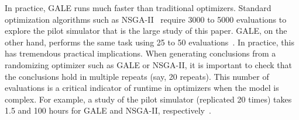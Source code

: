 \documentclass[journal]{IEEEtran}
\begin{document}
In practice, GALE runs much faster than traditional optimizers. 
Standard optimization algorithms such as NSGA-II~\cite{deb00afast} require 3000 to 5000 evaluations to explore the pilot simulator that is the large study of this paper. 
GALE, on the other hand, performs the same task using 25 to 50 evaluations~\cite{krallphd}.
In practice, this has tremendous practical implications.
When generating conclusions from a randomizing optimizer such as GALE or NSGA-II, it is important to check that the conclusions hold in multiple repeats (say, 20 repeats). 
This number of evaluations is a critical indicator of runtime in optimizers when the model is complex.
For example, a study of the pilot simulator (replicated 20 times)
takes 1.5 and 100 hours for GALE and NSGA-II, respectively~\cite{krallphd}.
\end{document}

